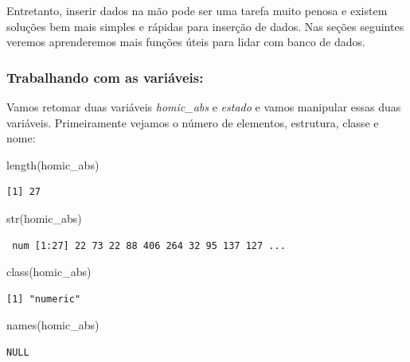 \documentclass[
  letterpaper,
  DIV=11,
  numbers=noendperiod]{scrreprt}
\newenvironment{Shaded}{\begin{snugshade}}{\end{snugshade}}
\newcommand{\FunctionTok}[1]{\textcolor[rgb]{0.28,0.35,0.67}{#1}}
\newcommand{\NormalTok}[1]{\textcolor[rgb]{0.00,0.23,0.31}{#1}}
\begin{document}
Entretanto, inserir dados na mão pode ser uma tarefa muito penosa e
existem soluções bem mais simples e rápidas para inserção de dados. Nas
seções seguintes veremos aprenderemos mais funções úteis para lidar com
banco de dados.

\subsubsection{Trabalhando com as
variáveis:}\label{trabalhando-com-as-variuxe1veis}

Vamos retomar duas variáveis \emph{homic\_abs} e \emph{estado} e vamos
manipular essas duas variáveis. Primeiramente vejamos o número de
elementos, estrutura, classe e nome:

\begin{Shaded}
\begin{Highlighting}[]
\FunctionTok{length}\NormalTok{(homic\_abs) }
\end{Highlighting}
\end{Shaded}

\begin{verbatim}
[1] 27
\end{verbatim}

\begin{Shaded}
\begin{Highlighting}[]
\FunctionTok{str}\NormalTok{(homic\_abs)    }
\end{Highlighting}
\end{Shaded}

\begin{verbatim}
 num [1:27] 22 73 22 88 406 264 32 95 137 127 ...
\end{verbatim}

\begin{Shaded}
\begin{Highlighting}[]
\FunctionTok{class}\NormalTok{(homic\_abs)  }
\end{Highlighting}
\end{Shaded}

\begin{verbatim}
[1] "numeric"
\end{verbatim}

\begin{Shaded}
\begin{Highlighting}[]
\FunctionTok{names}\NormalTok{(homic\_abs) }
\end{Highlighting}
\end{Shaded}

\begin{verbatim}
NULL
\end{verbatim}
\end{document}
